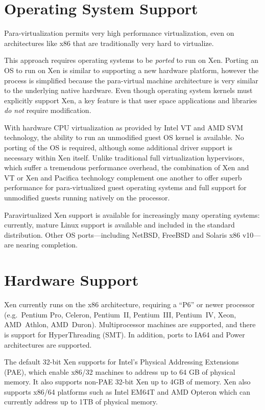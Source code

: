 \documentclass[11pt,twoside,final,openright]{report}
\begin{document}
\section{Operating System Support}

Para-virtualization permits very high performance virtualization, even
on architectures like x86 that are traditionally very hard to
virtualize.

This approach requires operating systems to be \emph{ported} to run on
Xen. Porting an OS to run on Xen is similar to supporting a new
hardware platform, however the process is simplified because the
para-virtual machine architecture is very similar to the underlying
native hardware. Even though operating system kernels must explicitly
support Xen, a key feature is that user space applications and
libraries \emph{do not} require modification.

With hardware CPU virtualization as provided by Intel VT and AMD
SVM technology, the ability to run an unmodified guest OS kernel
is available.  No porting of the OS is required, although some
additional driver support is necessary within Xen itself.  Unlike
traditional full virtualization hypervisors, which suffer a tremendous
performance overhead, the combination of Xen and VT or Xen and
Pacifica technology complement one another to offer superb performance
for para-virtualized guest operating systems and full support for
unmodified guests running natively on the processor.

Paravirtualized Xen support is available for increasingly many
operating systems: currently, mature Linux support is available and
included in the standard distribution.  Other OS ports---including
NetBSD, FreeBSD and Solaris x86 v10---are nearing completion. 


\section{Hardware Support}

Xen currently runs on the x86 architecture, requiring a ``P6'' or
newer processor (e.g.\ Pentium Pro, Celeron, Pentium~II, Pentium~III,
Pentium~IV, Xeon, AMD~Athlon, AMD~Duron). Multiprocessor machines are
supported, and there is support for HyperThreading (SMT).  In 
addition, ports to IA64 and Power architectures are supported.

The default 32-bit Xen supports for Intel's Physical Addressing Extensions (PAE), which enable x86/32 machines to address up to 64 GB of physical memory.
It also supports non-PAE 32-bit Xen up to 4GB of memory. 
Xen also supports x86/64 platforms such as Intel EM64T and AMD Opteron
which can currently address up to 1TB of physical memory.
\end{document}
